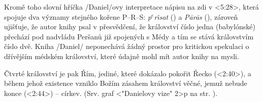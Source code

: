 Kromě toho slovní hříčka \x/Daniel/ovy interpretace nápisu na zdi v <5:28>, která spojuje dva významy stejného kořene P--R--S: {\it p$^e$r\oldaccents\^\i sat\/} () a
{\it P\oldaccents\=ar\oldaccents\=as} (), zároveň ujišťuje, že autor knihy psal v přesvědčení, že království číslo jedna (babylónské) přechází pod
nadvládu Peršanů již spojených s Médy a tím se stává královstvím číslo dvě. Kniha \x/Daniel/ neponechává žádný prostor pro kritickou spekulaci o dřívějším médském království, které
údajně mohl mít autor knihy na mysli.

Čtvrté království je pak Řím, jediné, které dokázalo pokořit Řecko (<2:40>), a během jehož existence vzniklo Božím zásahem království věčné, jemuž nebude konce (<2:44>) -- církev.
(Srv. graf <"Danielovy vize"  2>p na str. \pg).

\endinput


